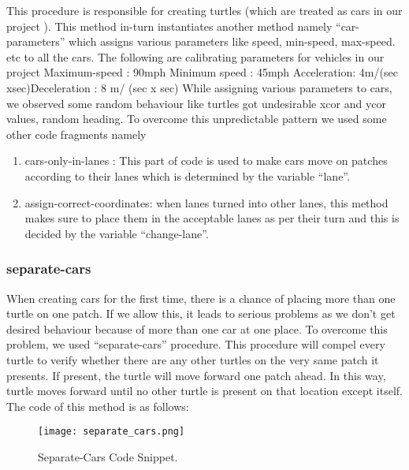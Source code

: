 \documentclass[11pt,a4paper]{article}
\begin{document}
This procedure is responsible for creating turtles (which are treated as cars in our project ). This method in-turn instantiates another method namely “car-parameters” which assigns various parameters like speed, min-speed, max-speed. etc to all the cars. The following are calibrating parameters for vehicles in our project\newline
Maximum-speed : 90mph\newline
Minimum speed : 45mph\newline
Acceleration: 4m/(sec xsec)Deceleration : 8 m/ (sec x sec)\newline
While assigning various parameters to cars, we observed some random behaviour like turtles got undesirable xcor and ycor values, random heading. To overcome this unpredictable pattern we used some other code fragments namely

\begin{enumerate}
\item cars-only-in-lanes :
This part of code is used to make cars move on patches according to their lanes which is determined by the variable “lane”.\newline
\item assign-correct-coordinates:
when lanes turned into other lanes, this method makes sure to place them in the acceptable lanes as per their turn and this is decided by the variable “change-lane”.
\end{enumerate}

\subsubsection{\textbf{separate-cars}}

When creating cars for the first time, there is a chance of placing more than one turtle on one patch. If we allow this, it leads to serious problems as we don’t get desired behaviour because of more than one car at one place. To overcome this problem, we used “separate-cars” procedure.\newline 
This procedure will compel every turtle to verify whether there are any other turtles on the very same patch it presents. If present, the turtle will move forward one patch ahead. In this way, turtle moves forward until no other turtle is present on that location except itself.\newline
The code of this method is as follows:

\begin{figure}[!ht]
\centering
\texttt{[image: separate\_cars.png]}
\caption{\label{fig:sc}Separate-Cars Code Snippet.}
\end{figure}
\end{document}
